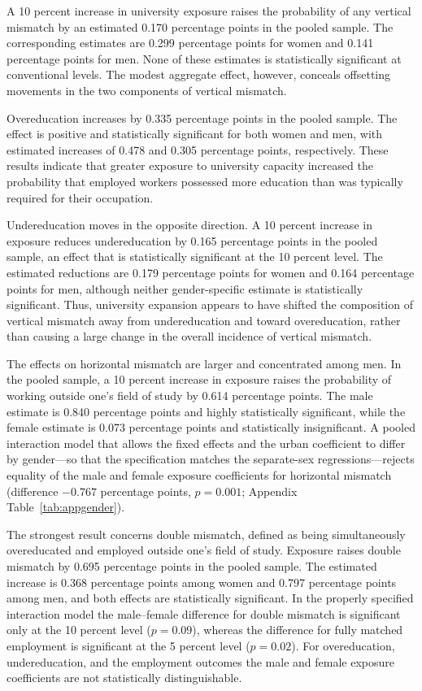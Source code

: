 A 10 percent increase in university exposure raises the probability of any vertical mismatch by an estimated 0.170 percentage points in the pooled sample. The corresponding estimates are 0.299 percentage points for women and 0.141 percentage points for men. None of these estimates is statistically significant at conventional levels. The modest aggregate effect, however, conceals offsetting movements in the two components of vertical mismatch.

Overeducation increases by 0.335 percentage points in the pooled sample. The effect is positive and statistically significant for both women and men, with estimated increases of 0.478 and 0.305 percentage points, respectively. These results indicate that greater exposure to university capacity increased the probability that employed workers possessed more education than was typically required for their occupation.

Undereducation moves in the opposite direction. A 10 percent increase in exposure reduces undereducation by 0.165 percentage points in the pooled sample, an effect that is statistically significant at the 10 percent level. The estimated reductions are 0.179 percentage points for women and 0.164 percentage points for men, although neither gender-specific estimate is statistically significant. Thus, university expansion appears to have shifted the composition of vertical mismatch away from undereducation and toward overeducation, rather than causing a large change in the overall incidence of vertical mismatch.

The effects on horizontal mismatch are larger and concentrated among men. In the pooled sample, a 10 percent increase in exposure raises the probability of working outside one's field of study by 0.614 percentage points. The male estimate is 0.840 percentage points and highly statistically significant, while the female estimate is 0.073 percentage points and statistically insignificant. A pooled interaction model that allows the fixed effects and the urban coefficient to differ by gender---so that the specification matches the separate-sex regressions---rejects equality of the male and female exposure coefficients for horizontal mismatch (difference $-0.767$ percentage points, $p=0.001$; Appendix Table~\ref{tab:appgender}).

The strongest result concerns double mismatch, defined as being simultaneously overeducated and employed outside one's field of study. Exposure raises double mismatch by 0.695 percentage points in the pooled sample. The estimated increase is 0.368 percentage points among women and 0.797 percentage points among men, and both effects are statistically significant. In the properly specified interaction model the male--female difference for double mismatch is significant only at the 10 percent level ($p=0.09$), whereas the difference for fully matched employment is significant at the 5 percent level ($p=0.02$). For overeducation, undereducation, and the employment outcomes the male and female exposure coefficients are not statistically distinguishable.


